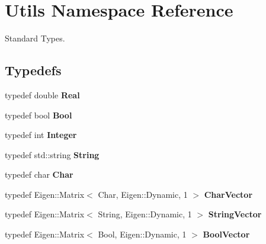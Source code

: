 \hypertarget{namespaceUtils}{
\section{Utils Namespace Reference}
\label{namespaceUtils}
}


Standard Types.  
\subsection*{Typedefs}
\begin{DoxyCompactItemize}
\item 
\hypertarget{namespaceUtils_a92b5548540d179126bb7f3d5d7308644}{
typedef double {\bfseries Real}}
\label{namespaceUtils_a92b5548540d179126bb7f3d5d7308644}

\item 
\hypertarget{namespaceUtils_af808a1eb18f779a8b275c000566b6ea0}{
typedef bool {\bfseries Bool}}
\label{namespaceUtils_af808a1eb18f779a8b275c000566b6ea0}

\item 
\hypertarget{namespaceUtils_a42abae4a43cc30dd019f62504efb7074}{
typedef int {\bfseries Integer}}
\label{namespaceUtils_a42abae4a43cc30dd019f62504efb7074}

\item 
\hypertarget{namespaceUtils_a9b7ba5c953773cf2789c3c9c35212ae2}{
typedef std::string {\bfseries String}}
\label{namespaceUtils_a9b7ba5c953773cf2789c3c9c35212ae2}

\item 
\hypertarget{namespaceUtils_a61ad62a0280c979cdc4503e60e525e2f}{
typedef char {\bfseries Char}}
\label{namespaceUtils_a61ad62a0280c979cdc4503e60e525e2f}

\item 
\hypertarget{namespaceUtils_a028885ca2ffafd569b4aabd706be1a35}{
typedef Eigen::Matrix$<$ Char, Eigen::Dynamic, 1 $>$ {\bfseries CharVector}}
\label{namespaceUtils_a028885ca2ffafd569b4aabd706be1a35}

\item 
\hypertarget{namespaceUtils_a40326230f02a88539cc7569153b9c828}{
typedef Eigen::Matrix$<$ String, Eigen::Dynamic, 1 $>$ {\bfseries StringVector}}
\label{namespaceUtils_a40326230f02a88539cc7569153b9c828}

\item 
\hypertarget{namespaceUtils_a48fc147be5cc1bcacd99d2e24a348ee0}{
typedef Eigen::Matrix$<$ Bool, Eigen::Dynamic, 1 $>$ {\bfseries BoolVector}}
\label{namespaceUtils_a48fc147be5cc1bcacd99d2e24a348ee0}


\end{DoxyCompactItemize}
